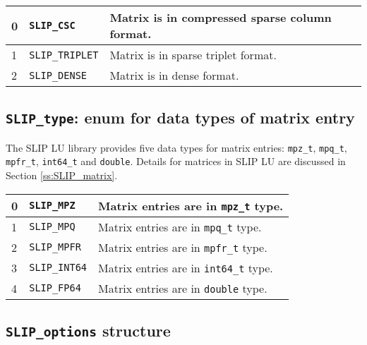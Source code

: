 \documentclass[12pt]{article}
\theoremstyle{definition}
\begin{document}
{\small
\begin{center}
\begin{tabular}{llp{4in}}
\hline
0 & \verb|SLIP_CSC| & Matrix is in compressed sparse column format. \\
\hline
1 & \verb|SLIP_TRIPLET|      & Matrix is in sparse triplet format. \\
\hline
2 & \verb|SLIP_DENSE|        & Matrix is in dense format.\\
\hline
\end{tabular}
\label{tab:SLIP_kind}
\end{center}
}

\cprotect\subsection{\verb|SLIP_type|: enum for data types of matrix entry}
\label{ss:SLIP_type}

The SLIP LU library provides five data types for matrix entries: \verb|mpz_t|,
\verb|mpq_t|, \verb|mpfr_t|, \verb|int64_t| and \verb|double|. Details for
matrices in SLIP LU are discussed in Section \ref{ss:SLIP_matrix}.


{\small
\begin{center}
\begin{tabular}{llp{4in}}
\hline
0 & \verb|SLIP_MPZ| &  Matrix entries are in \verb|mpz_t| type. \\
\hline
1 & \verb|SLIP_MPQ| &  Matrix entries are in \verb|mpq_t| type. \\
\hline
2 & \verb|SLIP_MPFR| &  Matrix entries are in \verb|mpfr_t| type. \\
\hline
3 & \verb|SLIP_INT64| &  Matrix entries are in \verb|int64_t| type. \\
\hline
4 & \verb|SLIP_FP64| &  Matrix entries are in \verb|double| type. \\
\hline
\end{tabular}
\label{tab:SLIP_type}
\end{center}
}

\cprotect\subsection{ \verb|SLIP_options| structure}
\label{ss:SLIP_options}
\end{document}
